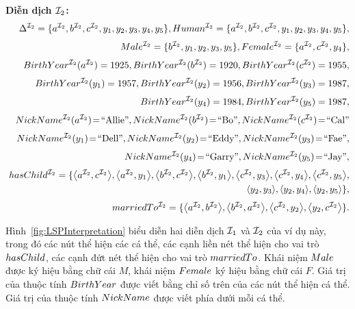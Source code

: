 \begin{Example}
	\noindent
	\textbf{Diễn dịch $\mathcal{I}_2$:}
	\allowdisplaybreaks
	\begin{eqnarray*}
		& &\!\!\!\! \Delta^{\mI_2} = \{a^{\mI_2}, b^{\mI_2}, c^{\mI_2}, y_1, y_2, y_3, y_4, y_5\},
		\Human^{\mI_2} = \{a^{\mI_2}, b^{\mI_2}, c^{\mI_2}, y_1, y_2, y_3, y_4, y_5\},\\[0.7ex]
		& &\!\!\!\! \Male^{\mI_2} = \{b^{\mI_2}, y_1, y_2, y_3, y_5\},
		\Female^{\mI_2} = \{a^{\mI_2}, c^{\mI_2}, y_4\},\\[0.7ex]
		& &\!\!\!\! \BirthYear^{\mI_2}(a^{\mI_2}) = 1925,
		\BirthYear^{\mI_2}(b^{\mI_2}) = 1920,
		\BirthYear^{\mI_2}(c^{\mI_2}) = 1955,\\[0.7ex]
		& &\!\!\!\! \BirthYear^{\mI_2}(y_1) = 1957,
		\BirthYear^{\mI_2}(y_2) = 1956,
		\BirthYear^{\mI_2}(y_3) = 1987,\\[0.7ex]
		& &\!\!\!\! \BirthYear^{\mI_2}(y_4) = 1984,
		\BirthYear^{\mI_2}(y_5) = 1987,\\[0.7ex]
		& &\!\!\!\! \NickName^{\mI_2}(a^{\mI_2})\! =\! \text{``Allie''},
		\NickName^{\mI_2}(b^{\mI_2})\! =\! \text{``Bo''},
		\NickName^{\mI_2}(c^{\mI_2})\! =\! \text{``Cal''}\\[0.7ex]
		& &\!\!\!\! \NickName^{\mI_2}(y_1)\! =\! \text{``Dell''},
		\NickName^{\mI_2}(y_2)\! =\! \text{``Eddy''},
		\NickName^{\mI_2}(y_3)\! =\! \text{``Fae''},\\[0.7ex]
		& &\!\!\!\! \NickName^{\mI_2}(y_4)\! =\! \text{``Garry''},
		\NickName^{\mI_2}(y_5)\! =\! \text{``Jay''},\\[0.7ex]
		& &\!\!\!\! \hasChild^{\mI_2} = \{\tuple{a^{\mI_2}, c^{\mI_2}}, \tuple{a^{\mI_2}, y_1}, \tuple{b^{\mI_2}, c^{\mI_2}}, \tuple{b^{\mI_2}, y_1}, \tuple{c^{\mI_2}, y_3},\tuple{c^{\mI_2}, y_4},\tuple{c^{\mI_2}, y_5},\\
		& &\!\!\!\! \qquad\qquad\qquad\;\;\;\tuple{y_2, y_3},\tuple{y_2, y_4},\tuple{y_2, y_5}\,\},\\[0.7ex]
		& &\!\!\!\! \marriedTo^{\mI_2} = \{\tuple{a^{\mI_2},b^{\mI_2}}, \tuple{b^{\mI_2}, a^{\mI_2}}, \tuple{c^{\mI_2},y_2}, \tuple{y_2,c^{\mI_2}}\,\}.
	\end{eqnarray*}

	Hình~\ref{fig:LSPInterpretation} biểu diễn hai diễn dịch $\mathcal{I}_1$ và $\mathcal{I}_2$ của ví dụ này, trong đó các nút thể hiện các cá thể, các cạnh liền nét thể hiện cho vai trò $hasChild$, các cạnh đứt nét thể hiện cho vai trò $marriedTo$. Khái niệm $Male$ được ký hiệu bằng chữ cái $M$, khái niệm $Female$ ký hiệu bằng chữ cái $F$. Giá trị của thuộc tính $BirthYear$ được viết bằng chỉ số trên của các nút thể hiện cá thể. Giá trị của thuộc tính $NickName$ được viết phía dưới mỗi cá thể.
		

\end{Example}
